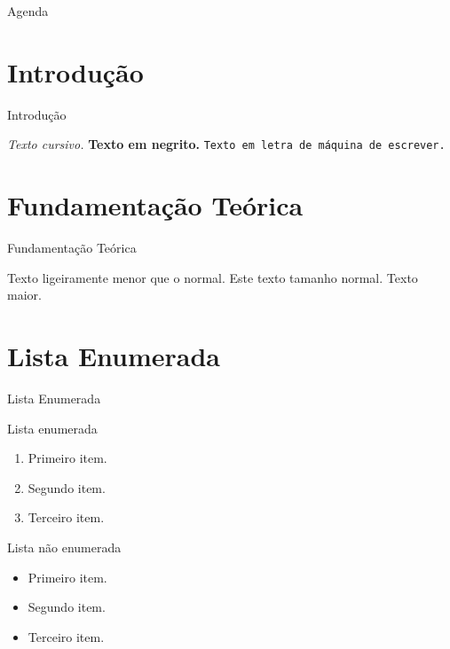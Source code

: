 \documentclass{beamer}
\begin{document}
\begin{frame}
    \maketitle
\end{frame}

\begin{frame}{Agenda}
    \tableofcontents
\end{frame}


\section{Introdução}

\begin{frame}{Introdução}

\textit{Texto cursivo.} \textbf{Texto  em negrito.} \texttt{Texto em letra de máquina de escrever.}

\end{frame}

\section{Fundamentação Teórica}

\begin{frame}{Fundamentação Teórica}

  \small{Texto ligeiramente menor que o normal.}
\normalsize{Este texto tamanho normal.}
\large{Texto maior.}

\end{frame}

\section{Lista Enumerada}
\begin{frame}{Lista Enumerada}

Lista enumerada
\begin{enumerate}
    \item Primeiro item.
    \item Segundo item.
    \item Terceiro item.
\end{enumerate}

Lista não enumerada
\begin{itemize}
     \item Primeiro item.
    \item Segundo item.
    \item Terceiro item.
\end{itemize}
    
\end{frame}
\end{document}
